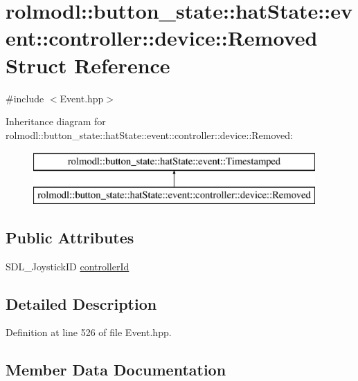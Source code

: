 \hypertarget{structrolmodl_1_1button__state_1_1hat_state_1_1event_1_1controller_1_1device_1_1_removed}{}\section{rolmodl\+::button\+\_\+state\+::hat\+State\+::event\+::controller\+::device\+::Removed Struct Reference}
\label{structrolmodl_1_1button__state_1_1hat_state_1_1event_1_1controller_1_1device_1_1_removed}


{\ttfamily \#include $<$Event.\+hpp$>$}

Inheritance diagram for rolmodl\+::button\+\_\+state\+::hat\+State\+::event\+::controller\+::device\+::Removed\+:\begin{figure}[H]
\begin{center}
\leavevmode
\includegraphics[height=2.000000cm]{structrolmodl_1_1button__state_1_1hat_state_1_1event_1_1controller_1_1device_1_1_removed}
\end{center}
\end{figure}
\subsection*{Public Attributes}
\begin{DoxyCompactItemize}
\item 
S\+D\+L\+\_\+\+Joystick\+ID \mbox{\hyperlink{structrolmodl_1_1button__state_1_1hat_state_1_1event_1_1controller_1_1device_1_1_removed_a09d4dae72fda156a02bb6c36f9b052f3}{controller\+Id}}
\end{DoxyCompactItemize}


\subsection{Detailed Description}


Definition at line 526 of file Event.\+hpp.



\subsection{Member Data Documentation}
\mbox{\label{structrolmodl_1_1button__state_1_1hat_state_1_1event_1_1controller_1_1device_1_1_removed_a09d4dae72fda156a02bb6c36f9b052f3}} 

